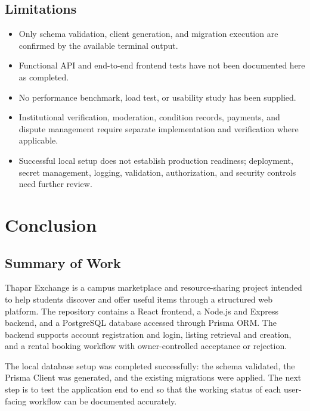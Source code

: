 \documentclass{tietreport}
\begin{document}
\section{Limitations}
\begin{itemize}
  \item Only schema validation, client generation, and migration execution are confirmed by the available terminal output.
  \item Functional API and end-to-end frontend tests have not been documented here as completed.
  \item No performance benchmark, load test, or usability study has been supplied.
  \item Institutional verification, moderation, condition records, payments, and dispute management require separate implementation and verification where applicable.
  \item Successful local setup does not establish production readiness; deployment, secret management, logging, validation, authorization, and security controls need further review.
\end{itemize}

\chapter{Conclusion}
\section{Summary of Work}
Thapar Exchange is a campus marketplace and resource-sharing project intended to help students discover and offer useful items through a structured web platform. The repository contains a React frontend, a Node.js and Express backend, and a PostgreSQL database accessed through Prisma ORM. The backend supports account registration and login, listing retrieval and creation, and a rental booking workflow with owner-controlled acceptance or rejection.

The local database setup was completed successfully: the schema validated, the Prisma Client was generated, and the existing migrations were applied. The next step is to test the application end to end so that the working status of each user-facing workflow can be documented accurately.
\end{document}

